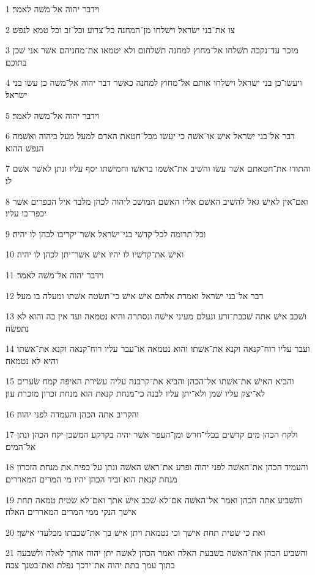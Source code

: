 \par 1 וידבר יהוה אל־משׁה לאמר׃
\par 2 צו את־בני ישׂראל וישׁלחו מן־המחנה כל־צרוע וכל־זב וכל טמא לנפשׁ׃
\par 3 מזכר עד־נקבה תשׁלחו אל־מחוץ למחנה תשׁלחום ולא יטמאו את־מחניהם אשׁר אני שׁכן בתוכם׃
\par 4 ויעשׂו־כן בני ישׂראל וישׁלחו אותם אל־מחוץ למחנה כאשׁר דבר יהוה אל־משׁה כן עשׂו בני ישׂראל׃
\par 5 וידבר יהוה אל־משׁה לאמר׃
\par 6 דבר אל־בני ישׂראל אישׁ או־אשׁה כי יעשׂו מכל־חטאת האדם למעל מעל ביהוה ואשׁמה הנפשׁ ההוא׃
\par 7 והתודו את־חטאתם אשׁר עשׂו והשׁיב את־אשׁמו בראשׁו וחמישׁתו יסף עליו ונתן לאשׁר אשׁם לו׃
\par 8 ואם־אין לאישׁ גאל להשׁיב האשׁם אליו האשׁם המושׁב ליהוה לכהן מלבד איל הכפרים אשׁר יכפר־בו עליו׃
\par 9 וכל־תרומה לכל־קדשׁי בני־ישׂראל אשׁר־יקריבו לכהן לו יהיה׃
\par 10 ואישׁ את־קדשׁיו לו יהיו אישׁ אשׁר־יתן לכהן לו יהיה׃
\par 11 וידבר יהוה אל־משׁה לאמר׃
\par 12 דבר אל־בני ישׂראל ואמרת אלהם אישׁ אישׁ כי־תשׂטה אשׁתו ומעלה בו מעל׃
\par 13 ושׁכב אישׁ אתה שׁכבת־זרע ונעלם מעיני אישׁה ונסתרה והיא נטמאה ועד אין בה והוא לא נתפשׂה׃
\par 14 ועבר עליו רוח־קנאה וקנא את־אשׁתו והוא נטמאה או־עבר עליו רוח־קנאה וקנא את־אשׁתו והיא לא נטמאה׃
\par 15 והביא האישׁ את־אשׁתו אל־הכהן והביא את־קרבנה עליה עשׂירת האיפה קמח שׂערים לא־יצק עליו שׁמן ולא־יתן עליו לבנה כי־מנחת קנאת הוא מנחת זכרון מזכרת עון׃
\par 16 והקריב אתה הכהן והעמדה לפני יהוה׃
\par 17 ולקח הכהן מים קדשׁים בכלי־חרשׂ ומן־העפר אשׁר יהיה בקרקע המשׁכן יקח הכהן ונתן אל־המים׃
\par 18 והעמיד הכהן את־האשׁה לפני יהוה ופרע את־ראשׁ האשׁה ונתן על־כפיה את מנחת הזכרון מנחת קנאת הוא וביד הכהן יהיו מי המרים המאררים׃
\par 19 והשׁביע אתה הכהן ואמר אל־האשׁה אם־לא שׁכב אישׁ אתך ואם־לא שׂטית טמאה תחת אישׁך הנקי ממי המרים המאררים האלה׃
\par 20 ואת כי שׂטית תחת אישׁך וכי נטמאת ויתן אישׁ בך את־שׁכבתו מבלעדי אישׁך׃
\par 21 והשׁביע הכהן את־האשׁה בשׁבעת האלה ואמר הכהן לאשׁה יתן יהוה אותך לאלה ולשׁבעה בתוך עמך בתת יהוה את־ירכך נפלת ואת־בטנך צבה׃
